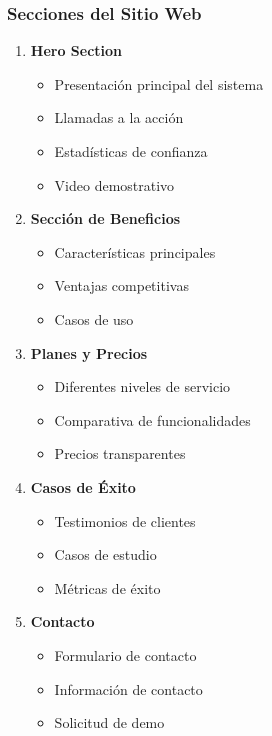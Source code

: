 \documentclass[12pt,a4paper]{article}
\begin{document}
\subsubsection{Secciones del Sitio Web}
\begin{enumerate}
    \item \textbf{Hero Section}
    \begin{itemize}
        \item Presentación principal del sistema
        \item Llamadas a la acción
        \item Estadísticas de confianza
        \item Video demostrativo
    \end{itemize}
    
    \item \textbf{Sección de Beneficios}
    \begin{itemize}
        \item Características principales
        \item Ventajas competitivas
        \item Casos de uso
    \end{itemize}
    
    \item \textbf{Planes y Precios}
    \begin{itemize}
        \item Diferentes niveles de servicio
        \item Comparativa de funcionalidades
        \item Precios transparentes
    \end{itemize}
    
    \item \textbf{Casos de Éxito}
    \begin{itemize}
        \item Testimonios de clientes
        \item Casos de estudio
        \item Métricas de éxito
    \end{itemize}
    
    \item \textbf{Contacto}
    \begin{itemize}
        \item Formulario de contacto
        \item Información de contacto
        \item Solicitud de demo
    \end{itemize}
\end{enumerate}
\end{document}
